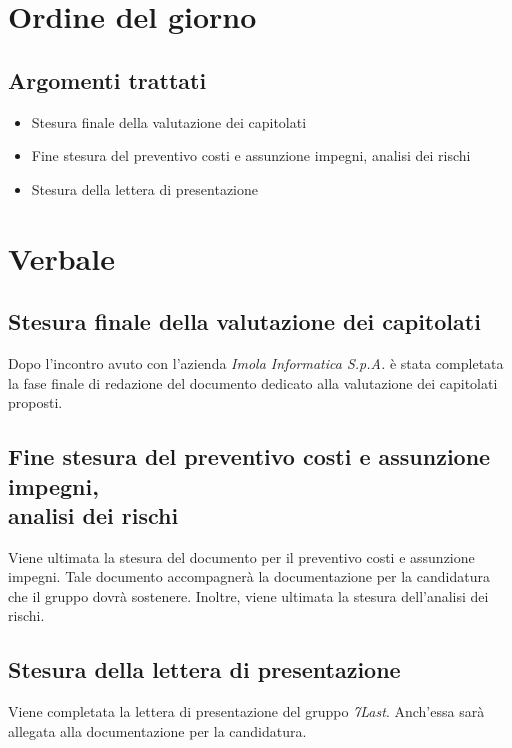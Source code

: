 \documentclass[italian,12pt]{article} %
\begin{document}
\section{Ordine del giorno}
\subsection{Argomenti trattati}
\begin{flushleft}
	\begin{itemize}
		\item Stesura finale della valutazione dei capitolati
		\item Fine stesura del preventivo costi e assunzione impegni, analisi dei rischi
		\item Stesura della lettera di presentazione
	\end{itemize}
\end{flushleft}


\newpage

\section{Verbale}
\subsection{Stesura finale della valutazione dei capitolati}
\begin{flushleft}
	Dopo l'incontro avuto con l'azienda \textit{Imola Informatica S.p.A.} è stata completata la fase finale di redazione del documento dedicato alla valutazione dei capitolati proposti.
\end{flushleft}
\subsection{Fine stesura del preventivo costi e assunzione impegni,\\analisi dei rischi}
\begin{flushleft}
	Viene ultimata la stesura del documento per il preventivo costi e assunzione impegni. Tale documento accompagnerà la documentazione per la candidatura che il gruppo dovrà sostenere. Inoltre, viene ultimata la stesura dell'analisi dei rischi.
\end{flushleft}
\subsection{Stesura della lettera di presentazione}
\begin{flushleft}
	Viene completata la lettera di presentazione del gruppo \textit{7Last}. Anch'essa sarà allegata alla documentazione per la candidatura.
\end{flushleft}
\end{document}
